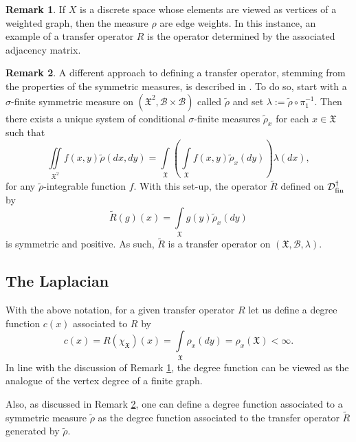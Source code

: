 \documentclass[11pt,reqno]{amsart}
\theoremstyle{remark}
\theoremstyle{definition}
\newtheorem{remark}{Remark}
\numberwithin{theorem}{section} \numberwithin{equation}{section}
\newcommand{\X}{\mathfrak{X}}
\begin{document}
\begin{remark}\label{rem:graph}
If $X$ is a discrete space whose elements are viewed as vertices of a weighted graph, then the measure
$\rho$ are edge weights. In this instance, an example of a transfer operator $R$ is the operator determined by the
associated adjacency matrix.
\end{remark}

\begin{remark}\label{rem:measure_to_transfer}
A different approach to defining a transfer operator, stemming from the properties of the symmetric measures, is described in \cite{BJ23}.
To do so, start with a $\sigma$-finite symmetric measure on $(\X^2,\mathcal{B}\times\mathcal{B})$ called $\tilde{\rho}$ and set  $\lambda:=\tilde\rho\circ\pi_1^{-1}$. Then there exists a unique system of conditional $\sigma$-finite measures $\tilde \rho_x$
for each $x \in \X$ such that
  $$
  \iint\limits_{\X^2}f(x,y)\tilde \rho (dx,dy) = \int\limits_\X \left(\int\limits_\X f(x,y) \tilde\rho_x(dy)\right)\lambda(dx),
  $$
  for any $\tilde\rho$-integrable function $f$. With this set-up, the operator $\tilde R$  defined on $\mathcal{D}_{\rm fin}^{\dagger} $ by
  $$
  \tilde{R}(g)(x)=\int\limits_\X g(y)\tilde\rho_x(dy)
  $$
  is symmetric and positive.  As such, $\tilde{R}$ is a transfer operator on $(\X,\mathcal{B},\lambda)$.
\end{remark}

\medskip
\subsection{The Laplacian}

With the above notation, for a given transfer operator $R$ let us define a degree function $c(x)$ associated to $R$ by
 \begin{equation}\label{eq. c defn}
 c(x)=R( \chi_{\X})(x)=\int\limits_{\X}\rho_x(dy)=\rho_x(\X)<\infty.
 \end{equation}
 In line with the discussion of Remark \ref{rem:graph}, the degree function can be viewed as the analogue of
 the vertex degree of a finite graph.

Also, as discussed in Remark \ref{rem:measure_to_transfer}, one can define a degree function associated to a symmetric measure $\tilde \rho$ as the degree function associated to the
transfer operator $\tilde R$ generated by $\tilde\rho$.
\end{document}
